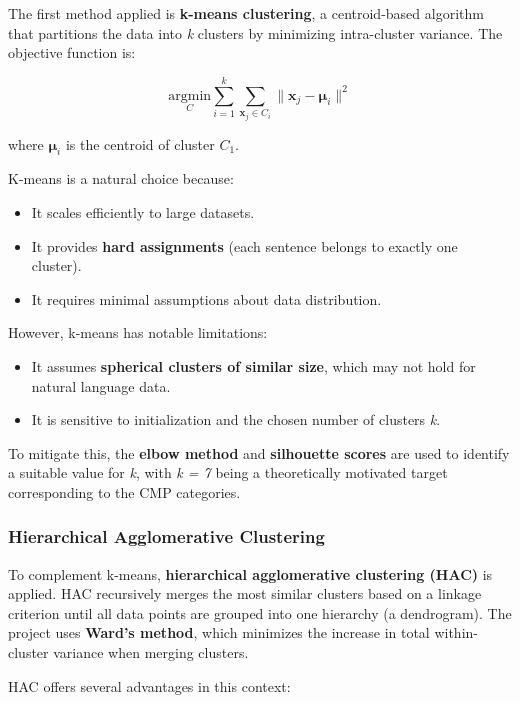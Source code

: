\documentclass[
  letterpaper,
  DIV=11,
  numbers=noendperiod]{scrartcl}
\providecommand{\tightlist}{%
  \setlength{\itemsep}{0pt}\setlength{\parskip}{0pt}}
\begin{document}
The first method applied is \textbf{k-means clustering}, a
centroid-based algorithm that partitions the data into \emph{k} clusters
by minimizing intra-cluster variance. The objective function is:

\[
\underset{C}{\text{argmin}} \sum_{i=1}^{k} \sum_{\mathbf{x}_j \in C_i} \|\mathbf{x}_j - \boldsymbol{\mu}_i\|^2
\]

where \(\boldsymbol{\mu}_i\) is the centroid of cluster \(C_1\).

K-means is a natural choice because:

\begin{itemize}
\tightlist
\item
  It scales efficiently to large datasets.
\item
  It provides \textbf{hard assignments} (each sentence belongs to
  exactly one cluster).
\item
  It requires minimal assumptions about data distribution.
\end{itemize}

However, k-means has notable limitations:

\begin{itemize}
\tightlist
\item
  It assumes \textbf{spherical clusters of similar size}, which may not
  hold for natural language data.
\item
  It is sensitive to initialization and the chosen number of clusters
  \emph{k}.
\end{itemize}

To mitigate this, the \textbf{elbow method} and \textbf{silhouette
scores} are used to identify a suitable value for \emph{k}, with \emph{k
= 7} being a theoretically motivated target corresponding to the CMP
categories.

\subsubsection{Hierarchical Agglomerative
Clustering}\label{hierarchical-agglomerative-clustering}

To complement k-means, \textbf{hierarchical agglomerative clustering
(HAC)} is applied. HAC recursively merges the most similar clusters
based on a linkage criterion until all data points are grouped into one
hierarchy (a dendrogram). The project uses \textbf{Ward's method}, which
minimizes the increase in total within-cluster variance when merging
clusters.

HAC offers several advantages in this context:
\end{document}
